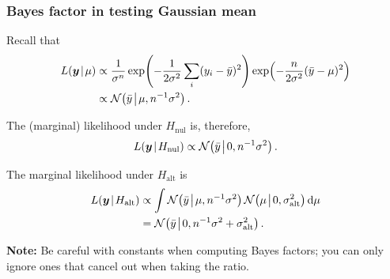 \documentclass[18pt, handout]{beamer}
\newcommand{\defineTightSpacing}{%
	\setlength{\abovedisplayskip}{.25\baselineskip}%
	\setlength{\belowdisplayskip}{.25\baselineskip}%
}
\newcommand{\given}{\mskip.7\thinmuskip | \mskip.7\thinmuskip}
\newcommand{\midGiven}{\mskip.7\thinmuskip \middle| \mskip.7\thinmuskip}
\newcommand{\diff}{\operatorname{\mathrm{d}}\!{}}
\newcommand{\normalDist}{\operatorname{\mathcal{N}}}
\newcommand{\likelihood}{L}
\newcommand{\by}{\bm{y}}
\newcommand{\hypothesis}{H}
\newcommand{\nullSub}{\mathrm{nul}}
\newcommand{\altSub}{\mathrm{alt}}
\begin{document}
\begin{frame}
\frametitle{Bayes factor in testing Gaussian mean}
Recall that
\begin{equation*} \defineTightSpacing%
\begin{aligned}
\likelihood(\by \given \mu)
	&\propto \frac{1}{\sigma^n}
		\exp\!\left( - \frac{1}{2 \sigma^2} \sum_i (y_i - \bar{y})^2 \right)
		\exp\!\left( - \frac{n}{2 \sigma^2} (\bar{y} - \mu)^2 \right) \\
	&\propto \normalDist\!\left(
		\bar{y} \midGiven \mu, n^{-1} \sigma^2
	\right).
\end{aligned}
\end{equation*}

\smallskip
The (marginal) likelihood under $\hypothesis_\nullSub$ is, therefore, 
\begin{equation*} \defineTightSpacing%
\likelihood(\by \given \hypothesis_\nullSub)
	\propto \normalDist\!\left(
		\bar{y} \midGiven 0, n^{-1} \sigma^2
	\right).
\end{equation*}

The marginal likelihood under $\hypothesis_\altSub$ is 
\begin{equation*} \defineTightSpacing%
\begin{aligned}
\likelihood(\by \given \hypothesis_\altSub)
	&\propto \int \normalDist\!\left(
		\bar{y} \midGiven \mu, n^{-1} \sigma^2
	\right)
	\normalDist\!\left(
		\mu \midGiven 0, \sigma_\altSub^2
	\right) \diff \mu \\
	&= \normalDist\!\left(
		\bar{y} \midGiven 0, n^{-1} \sigma^2 + \sigma_\altSub^2
	\right).
\end{aligned}
\end{equation*}

\textbf{Note:} Be careful with constants when computing Bayes factors; 
you can only ignore ones that cancel out when taking the ratio. %
\end{frame}
\end{document}
